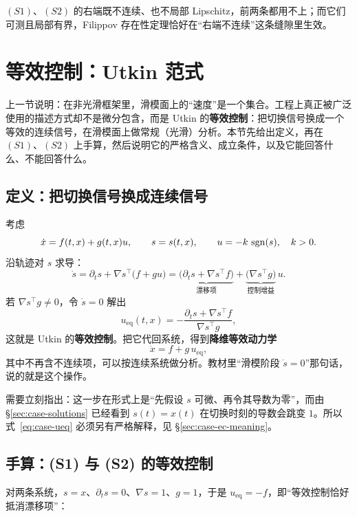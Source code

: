 $(S1)$、$(S2)$ 的右端既不连续、也不局部 Lipschitz，前两条都用不上；而它们可测且局部有界，Filippov 存在性定理恰好在“右端不连续”这条缝隙里生效。

\section{等效控制：Utkin 范式}\label{sec:case-ec}

上一节说明：在非光滑框架里，滑模面上的“速度”是一个集合。工程上真正被广泛使用的描述方式却不是微分包含，而是 Utkin 的\textbf{等效控制}：把切换信号换成一个等效的连续信号，在滑模面上做常规（光滑）分析。本节先给出定义，再在 $(S1)$、$(S2)$ 上手算，然后说明它的严格含义、成立条件，以及它能回答什么、不能回答什么。

\subsection{定义：把切换信号换成连续信号}

考虑
\begin{equation}\label{eq:case-affine}
  \dot x=f(t,x)+g(t,x)u,\qquad s=s(t,x),\qquad u=-k\,\operatorname{sgn}(s),\quad k>0 .
\end{equation}
沿轨迹对 $s$ 求导：
\[
\dot s=\partial_t s+\nabla s^\top\big(f+gu\big)
=\underbrace{\big(\partial_t s+\nabla s^\top f\big)}_{\text{漂移项}}
+\underbrace{\big(\nabla s^\top g\big)}_{\text{控制增益}}\,u .
\]
若 $\nabla s^\top g\neq0$，令 $\dot s=0$ 解出
\begin{equation}\label{eq:case-ueq}
  u_\mathrm{eq}(t,x)=-\frac{\partial_t s+\nabla s^\top f}{\nabla s^\top g},
\end{equation}
这就是 Utkin 的\textbf{等效控制}。把它代回系统，得到\textbf{降维等效动力学}
\[
\dot x=f+g\,u_\mathrm{eq},
\]
其中不再含不连续项，可以按连续系统做分析。教材里“滑模阶段 $\dot s=0$”那句话，说的就是这个操作。

需要立刻指出：这一步在形式上是“先假设 $s$ 可微、再令其导数为零”，而由 \S\ref{sec:case-solutions} 已经看到 $s(t)=x(t)$ 在切换时刻的导数会跳变 $1$。所以式~\eqref{eq:case-ueq} 必须另有严格解释，见 \S\ref{sec:case-ec-meaning}。

\subsection{手算：(S1) 与 (S2) 的等效控制}

对两条系统，$s=x$、$\partial_t s=0$、$\nabla s=1$、$g=1$，于是 $u_\mathrm{eq}=-f$，即“等效控制恰好抵消漂移项”：

